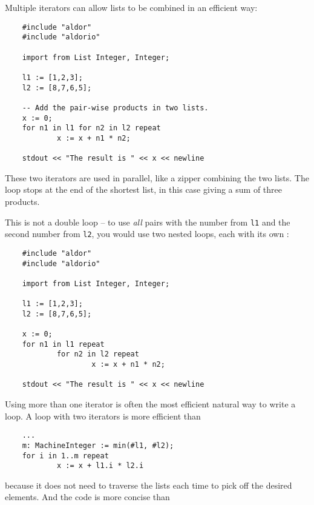 {Multiple  iterators can allow lists to be combined in an
efficient way:

\begin{small}
\begin{verbatim}
    #include "aldor"
    #include "aldorio"

    import from List Integer, Integer;

    l1 := [1,2,3];
    l2 := [8,7,6,5];

    -- Add the pair-wise products in two lists.
    x := 0;
    for n1 in l1 for n2 in l2 repeat
            x := x + n1 * n2;

    stdout << "The result is " << x << newline
\end{verbatim}
\end{small}
}

These two  iterators are used in parallel, like a zipper
combining the two lists.  The loop stops at the end of the shortest
list, in this case giving a sum of three products.  

This is not a double loop -- to use {\em all} pairs with the number
from \verb"l1" and the second number from \verb"l2",
you would use two nested loops, each with its own :

\begin{small}
\begin{verbatim}
    #include "aldor"
    #include "aldorio"

    import from List Integer, Integer;

    l1 := [1,2,3];
    l2 := [8,7,6,5];

    x := 0;
    for n1 in l1 repeat
            for n2 in l2 repeat
                    x := x + n1 * n2;

    stdout << "The result is " << x << newline
\end{verbatim}
\end{small}

Using more than one iterator is often the most efficient natural way to write
a loop.  A loop with two  iterators is more efficient than

\begin{small}
\begin{verbatim}
    ...
    m: MachineInteger := min(#l1, #l2);
    for i in 1..m repeat
            x := x + l1.i * l2.i
\end{verbatim}
\end{small}

because it does not need to traverse the lists each time to pick off
the desired elements.  And the code is more concise than

